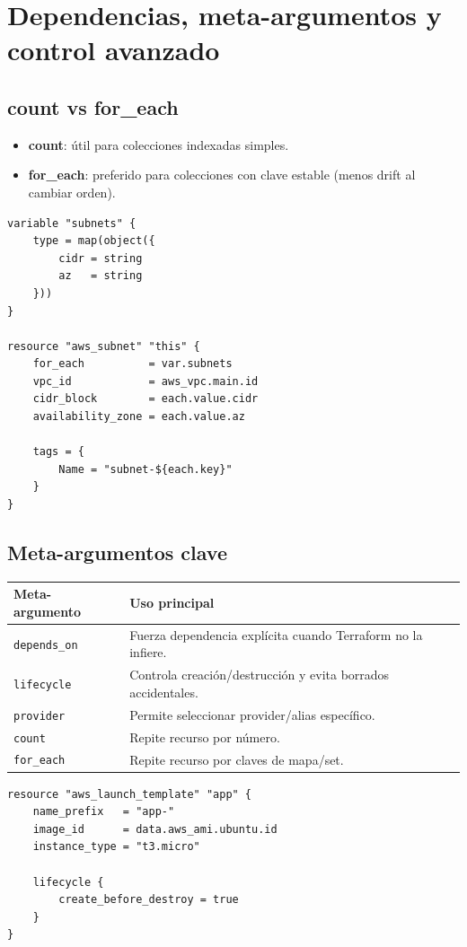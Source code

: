 \documentclass[12pt,a4paper]{article}
\begin{document}
\section{Dependencias, meta-argumentos y control avanzado}

\subsection{count vs for\_each}
\begin{itemize}
		\item \textbf{count}: útil para colecciones indexadas simples.
		\item \textbf{for\_each}: preferido para colecciones con clave estable (menos drift al cambiar orden).
\end{itemize}

\begin{lstlisting}[caption=for\_each recomendado]
variable "subnets" {
	type = map(object({
		cidr = string
		az   = string
	}))
}

resource "aws_subnet" "this" {
	for_each          = var.subnets
	vpc_id            = aws_vpc.main.id
	cidr_block        = each.value.cidr
	availability_zone = each.value.az

	tags = {
		Name = "subnet-${each.key}"
	}
}
\end{lstlisting}

\subsection{Meta-argumentos clave}
\begin{longtable}{p{} p{}}
\toprule
\textbf{Meta-argumento} & \textbf{Uso principal} \\
\midrule
\texttt{depends\_on} & Fuerza dependencia explícita cuando Terraform no la infiere. \\
\texttt{lifecycle} & Controla creación/destrucción y evita borrados accidentales. \\
\texttt{provider} & Permite seleccionar provider/alias específico. \\
\texttt{count} & Repite recurso por número. \\
\texttt{for\_each} & Repite recurso por claves de mapa/set. \\
\bottomrule
\end{longtable}

\begin{lstlisting}[caption=lifecycle para minimizar downtime]
resource "aws_launch_template" "app" {
	name_prefix   = "app-"
	image_id      = data.aws_ami.ubuntu.id
	instance_type = "t3.micro"

	lifecycle {
		create_before_destroy = true
	}
}
\end{lstlisting}
\end{document}
